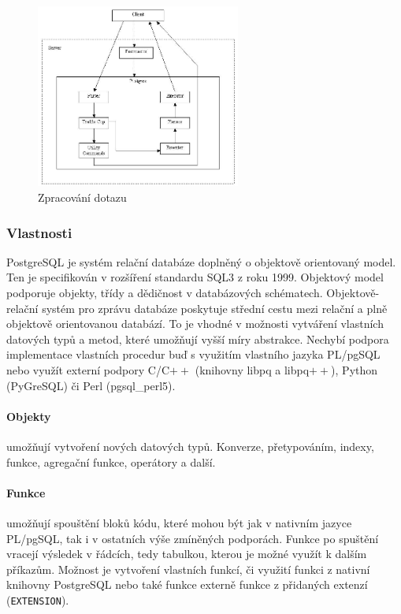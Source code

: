 \documentclass[a4paper,12pt,oneside]{report}
\begin{document}
  
\begin{figure}[h!]
    \centering
    \includegraphics[width=0.6\textwidth]{./img/implementace/postgremodel1.jpg}
    \caption[Dotaz PostgreSQL]{\centering  Zpracování dotazu \footnotemark}
 \end{figure}   




\subsubsection{Vlastnosti}
PostgreSQL je systém relační databáze doplněný o objektově orientovaný model. Ten je specifikován v rozšíření standardu SQL3 z roku 1999\cite{sql1999}. Objektový model podporuje objekty, třídy a dědičnost v databázových schématech. Objektově-relační systém pro zprávu databáze  poskytuje střední cestu mezi relační a plně objektově orientovanou databází. To je vhodné v možnosti vytváření vlastních datových typů a metod, které umožňují vyšší míry abstrakce. Nechybí podpora implementace vlastních procedur buď s využitím vlastního jazyka PL/pgSQL nebo využít externí podpory C/C$++$ (knihovny libpq a libpq$++$), Python (PyGreSQL) či Perl (pgsql\_perl5).


\paragraph{Objekty} umožňují vytvoření nových datových typů. Konverze, přetypováním, indexy, funkce, agregační funkce, operátory a další.  
\paragraph*{Funkce} umožňují spouštění bloků kódu, které mohou být jak v nativním jazyce PL/pgSQL, tak i v ostatních výše zmíněných podporách. Funkce po spuštění vracejí výsledek v řádcích, tedy tabulkou, kterou je možné využít k dalším příkazům. Možnost je vytvoření vlastních funkcí, či využití funkci z nativní knihovny PostgreSQL nebo také funkce externě funkce z přidaných extenzí (\texttt{EXTENSION}).
\end{document}
